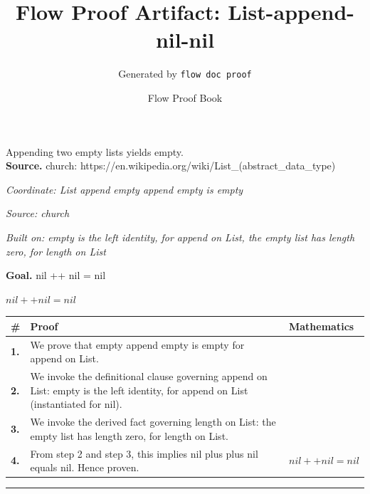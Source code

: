 \documentclass[11pt]{article}
\title{Flow Proof Artifact: List-append-nil-nil}
\author{Generated by \texttt{flow doc proof}}
\date{Flow Proof Book}
\theoremstyle{definition}
\begin{document}
\maketitle
Appending two empty lists yields empty.\\[0.5em]
\textbf{Source.} church: https://en.wikipedia.org/wiki/List\_(abstract\_data\_type)\\[0.5em]
\bigskip
{}\par
\smallskip\noindent\textit{Coordinate: List \cdot append \cdot empty append empty is empty}\par
\smallskip\noindent\textit{Source: church}\par
\smallskip\noindent\textit{Built on: empty is the left identity, for append on List, the empty list has length zero, for length on List}\par
\medskip
\noindent\textbf{Goal.} nil ++ nil = nil\par
\noindent$\displaystyle nil ++ nil = nil$\par
\medskip
\noindent
\begin{tabular}{@{} >{\raggedright\arraybackslash}p{} >{\raggedright\arraybackslash}p{} >{\raggedleft\arraybackslash}p{} @{}}
\textbf{\#} & \textbf{Proof} & \textbf{Mathematics} \\
\midrule
\textbf{1.} & We prove that empty append empty is empty for append on List. & \\[0.45em]
\textbf{2.} & We invoke the definitional clause governing append on List: empty is the left identity, for append on List (instantiated for nil). & \\[0.45em]
\textbf{3.} & We invoke the derived fact governing length on List: the empty list has length zero, for length on List. & \\[0.45em]
\textbf{4.} & From step 2 and step 3, this implies nil plus plus nil equals nil. Hence proven. & $\displaystyle nil ++ nil = nil$ \\[0.45em]
\bottomrule
\end{tabular}
\label{thm:List-append-empty_append_empty_is_empty}
\par\medskip\hrule
\end{document}
